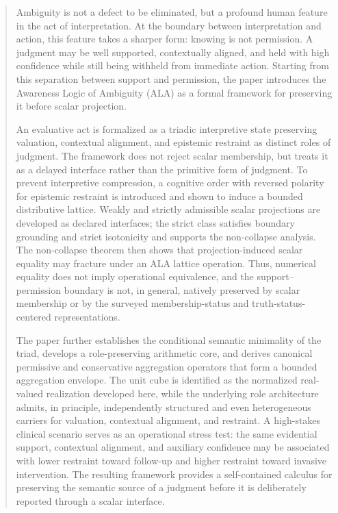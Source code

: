 \documentclass[reqno,final]{amsart}
\theoremstyle{definition}
\theoremstyle{plain}
\theoremstyle{remark}
\begin{document}
\begin{abstract}
Ambiguity is not a defect to be eliminated, but a profound human feature in the act of interpretation. At the boundary between interpretation and action, this feature takes a sharper form: knowing is not permission. A judgment may be well supported, contextually aligned, and held with high confidence while still being withheld from immediate action. Starting from this separation between support and permission, the paper introduces the Awareness Logic of Ambiguity (ALA) as a formal framework for preserving it before scalar projection.

An evaluative act is formalized as a triadic interpretive state preserving valuation, contextual alignment, and epistemic restraint as distinct roles of judgment. The framework does not reject scalar membership, but treats it as a delayed interface rather than the primitive form of judgment. To prevent interpretive compression, a cognitive order with reversed polarity for epistemic restraint is introduced and shown to induce a bounded distributive lattice. Weakly and strictly admissible scalar projections are developed as declared interfaces; the strict class satisfies boundary grounding and strict isotonicity and supports the non-collapse analysis. The non-collapse theorem then shows that projection-induced scalar equality may fracture under an ALA lattice operation. Thus, numerical equality does not imply operational equivalence, and the support--permission boundary is not, in general, natively preserved by scalar membership or by the surveyed membership-status and truth-status-centered representations.

The paper further establishes the conditional semantic minimality of the triad, develops a role-preserving arithmetic core, and derives canonical permissive and conservative aggregation operators that form a bounded aggregation envelope. The unit cube is identified as the normalized real-valued realization developed here, while the underlying role architecture admits, in principle, independently structured and even heterogeneous carriers for valuation, contextual alignment, and restraint. A high-stakes clinical scenario serves as an operational stress test: the same evidential support, contextual alignment, and auxiliary confidence may be associated with lower restraint toward follow-up and higher restraint toward invasive intervention. The resulting framework provides a self-contained calculus for preserving the semantic source of a judgment before it is deliberately reported through a scalar interface.
\end{abstract}
\end{document}
